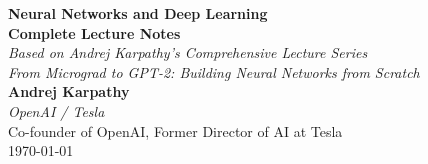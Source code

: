 \documentclass[11pt]{article}
\theoremstyle{definition}
\begin{document}
\thispagestyle{empty}
\begin{center}
\vspace*{1cm}

\Huge\textbf{\color{blue!80!black}Neural Networks and Deep Learning}\\[0.4cm]
\LARGE\textbf{\color{blue!60!black}Complete Lecture Notes}\\[0.8cm]
\large\textit{Based on Andrej Karpathy's Comprehensive Lecture Series}\\[0.3cm]
\normalsize\textit{From Micrograd to GPT-2: Building Neural Networks from Scratch}\\[1.5cm]

\Large\textbf{Andrej Karpathy}\\[0.3cm]
\large\textit{OpenAI / Tesla}\\[0.2cm]
\normalsize Co-founder of OpenAI, Former Director of AI at Tesla\\[1cm]

\Large\today
\end{center}
\end{document}
